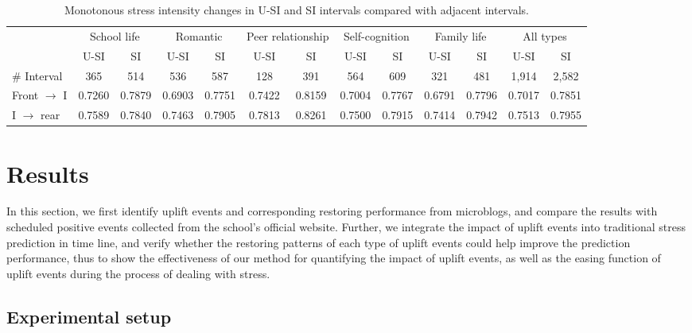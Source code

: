 \begin{table}
\begin{center}
\caption{Monotonous stress intensity changes in U-SI and SI intervals compared with adjacent intervals.}
\begin{tabular}{l cccccc cccccc} \\\hline\hline
\multirow{2}{1cm}{}
&\multicolumn{2}{c}{School life}
&\multicolumn{2}{c}{Romantic}
&\multicolumn{2}{c}{Peer relationship}
&\multicolumn{2}{c}{Self-cognition}
&\multicolumn{2}{c}{Family life}
&\multicolumn{2}{c}{All types}\\
&U-SI	    &	SI	        &U-SI	    &SI	        &U-SI	   &SI	
&U-SI	    &	SI	        &	U-SI	&SI	        &U-SI	   &SI\\  \hline
\# Interval         &   365	        &	514	        &	536	        &	587	        &128	    &	391	        &	564	           &	609	            &	321	        &	481	        &	1,914	    &2,582	 \\
Front $\rightarrow$ I &	0.7260 	&	0.7879 	&	0.6903 	&	0.7751 	&	0.7422 	&	0.8159 	&	0.7004 	&	0.7767 	&	0.6791 &	0.7796 	&	0.7017 	&   0.7851\\
I $\rightarrow$ rear  &	0.7589 	&	0.7840 	&	0.7463 	&	0.7905 	&	0.7813 	&	0.8261 	&	0.7500 	&	0.7915 	&	0.7414 	&	0.7942 	&	0.7513 	&   0.7955\\ \hline \hline
\end{tabular}%
\label{tab:fontrear}
\end{center}
\end{table}

\section{Results}
In this section,
we first identify uplift events and corresponding restoring performance from microblogs,
and compare the results with scheduled positive events collected from the school's official website.
Further, we integrate the impact of uplift events into traditional stress prediction in time line,
and verify whether the restoring patterns of each type of uplift events could help improve the prediction performance,
thus to show the effectiveness of our method for quantifying the impact of uplift events,
as well as the easing function of uplift events during the process of dealing with stress.

\subsection{Experimental setup}
